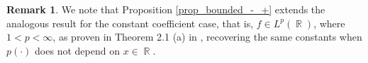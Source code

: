\documentclass[11pt,reqno]{amsart}
\newtheorem{prop}[theorem]{Proposition}
\theoremstyle{definition}
\theoremstyle{definition}
\newtheorem{obs}{Remark}
\theoremstyle{definition}
\DeclareMathOperator{\R}{\mathbb{R}}
\newcommand{\p}{p(\cdot)}
\begin{document}
\begin{obs}
    We note that Proposition \ref{prop_bounded_-_+} extends the analogous result for the constant coefficient case, that is, $f\in L^p(\R)$, where $1<p<\infty$, as proven in Theorem 2.1 (a) in \cite{Talvila2025}, recovering the same constants when $\p$ does not depend on $x\in\R$.
\end{obs}
\end{document}
